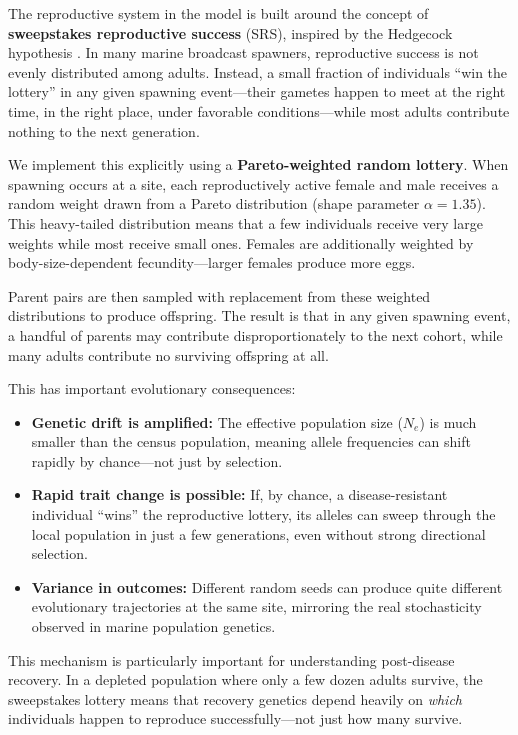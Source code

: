 \documentclass[11pt]{article}
\begin{document}
The reproductive system in the model is built around the concept of \textbf{sweepstakes reproductive success} (SRS), inspired by the Hedgecock hypothesis \citep{hedgecock2011}. In many marine broadcast spawners, reproductive success is not evenly distributed among adults. Instead, a small fraction of individuals ``win the lottery'' in any given spawning event---their gametes happen to meet at the right time, in the right place, under favorable conditions---while most adults contribute nothing to the next generation.

We implement this explicitly using a \textbf{Pareto-weighted random lottery}. When spawning occurs at a site, each reproductively active female and male receives a random weight drawn from a Pareto distribution (shape parameter $\alpha = 1.35$). This heavy-tailed distribution means that a few individuals receive very large weights while most receive small ones. Females are additionally weighted by body-size-dependent fecundity---larger females produce more eggs.

Parent pairs are then sampled with replacement from these weighted distributions to produce offspring. The result is that in any given spawning event, a handful of parents may contribute disproportionately to the next cohort, while many adults contribute no surviving offspring at all.

This has important evolutionary consequences:
\begin{itemize}[leftmargin=2em]
    \item \textbf{Genetic drift is amplified:} The effective population size ($N_e$) is much smaller than the census population, meaning allele frequencies can shift rapidly by chance---not just by selection.
    \item \textbf{Rapid trait change is possible:} If, by chance, a disease-resistant individual ``wins'' the reproductive lottery, its alleles can sweep through the local population in just a few generations, even without strong directional selection.
    \item \textbf{Variance in outcomes:} Different random seeds can produce quite different evolutionary trajectories at the same site, mirroring the real stochasticity observed in marine population genetics.
\end{itemize}

This mechanism is particularly important for understanding post-disease recovery. In a depleted population where only a few dozen adults survive, the sweepstakes lottery means that recovery genetics depend heavily on \textit{which} individuals happen to reproduce successfully---not just how many survive.
\end{document}
